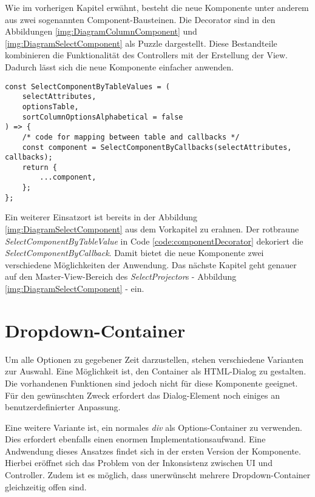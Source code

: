 Wie im vorherigen Kapitel erwähnt, besteht die neue Komponente unter anderem aus zwei sogenannten Component-Bausteinen.
Die Decorator sind in den Abbildungen \ref{img:DiagramColumnComponent} und \ref{img:DiagramSelectComponent} als Puzzle dargestellt.
Diese Bestandteile kombinieren die Funktionalität des Controllers mit der Erstellung der View.
Dadurch lässt sich die neue Komponente einfacher anwenden.

\begin{lstlisting}[style = htmlcssjs, caption = SelectComponentByTableValue dekoriert SelectComponentByCallback, label = code:componentDecorator]
const SelectComponentByTableValues = (
    selectAttributes,
    optionsTable,
    sortColumnOptionsAlphabetical = false
) => {
    /* code for mapping between table and callbacks */
    const component = SelectComponentByCallbacks(selectAttributes, callbacks);
    return {
        ...component,
    };
};
\end{lstlisting}

Ein weiterer Einsatzort ist bereits in der Abbildung \ref{img:DiagramSelectComponent} aus dem Vorkapitel zu erahnen.
Der rotbraune \emph{SelectComponentByTableValue} in Code \ref{code:componentDecorator} dekoriert die \emph{SelectComponentByCallback}.
Damit bietet die neue Komponente zwei verschiedene Möglichkeiten der Anwendung.
Das nächste Kapitel geht genauer auf den Master-View-Bereich des \emph{SelectProjector}s - Abbildung \ref{img:DiagramSelectComponent} - ein.


\section{Dropdown-Container}
\label{sec:dropdownContainer}

Um alle Optionen zu gegebener Zeit darzustellen, stehen verschiedene Varianten zur Auswahl.
Eine Möglichkeit ist, den Container als HTML-Dialog zu gestalten.
Die vorhandenen Funktionen sind jedoch nicht für diese Komponente geeignet.
Für den gewünschten Zweck erfordert das Dialog-Element noch einiges an benutzerdefinierter Anpassung.

Eine weitere Variante ist, ein normales \emph{div} als Options-Container zu verwenden.
Dies erfordert ebenfalls einen enormen Implementationsaufwand.
Eine Andwendung dieses Ansatzes findet sich in der ersten Version der Komponente.
Hierbei eröffnet sich das Problem von der Inkonsistenz zwischen UI und Controller.
Zudem ist es möglich, dass unerwünscht mehrere Dropdown-Container gleichzeitig offen sind.

